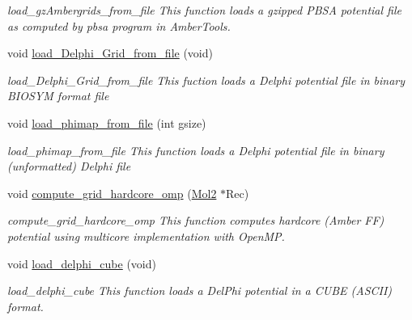 \begin{DoxyCompactItemize}
\begin{DoxyCompactList}\small\item\em load\_\-gzAmbergrids\_\-from\_\-file This function loads a gzipped PBSA potential file as computed by pbsa program in AmberTools. \item\end{DoxyCompactList}\item 
\hypertarget{classGrid_a2399133a44e1a2c01ac535b710d0d8bd}{
void \hyperlink{classGrid_a2399133a44e1a2c01ac535b710d0d8bd}{load\_\-Delphi\_\-Grid\_\-from\_\-file} (void)}
\label{classGrid_a2399133a44e1a2c01ac535b710d0d8bd}

\begin{DoxyCompactList}\small\item\em load\_\-Delphi\_\-Grid\_\-from\_\-file This fuction loads a Delphi potential file in binary BIOSYM format file \item\end{DoxyCompactList}\item 
void \hyperlink{classGrid_a225400892c1206c62a7fc8c8caf8b287}{load\_\-phimap\_\-from\_\-file} (int gsize)
\begin{DoxyCompactList}\small\item\em load\_\-phimap\_\-from\_\-file This function loads a Delphi potential file in binary (unformatted) Delphi file \item\end{DoxyCompactList}\item 
void \hyperlink{classGrid_a3e0a095c71b771e043ff265769cca7c8}{compute\_\-grid\_\-hardcore\_\-omp} (\hyperlink{classMol2}{Mol2} $\ast$Rec)
\begin{DoxyCompactList}\small\item\em compute\_\-grid\_\-hardcore\_\-omp This function computes hardcore (Amber FF) potential using multicore implementation with OpenMP. \item\end{DoxyCompactList}\item 
\hypertarget{classGrid_ac7e5328a7eb65b50c15352198a4f0f13}{
void \hyperlink{classGrid_ac7e5328a7eb65b50c15352198a4f0f13}{load\_\-delphi\_\-cube} (void)}
\label{classGrid_ac7e5328a7eb65b50c15352198a4f0f13}

\begin{DoxyCompactList}\small\item\em load\_\-delphi\_\-cube This function loads a DelPhi potential in a CUBE (ASCII) format. \item\end{DoxyCompactList}\end{DoxyCompactItemize}
